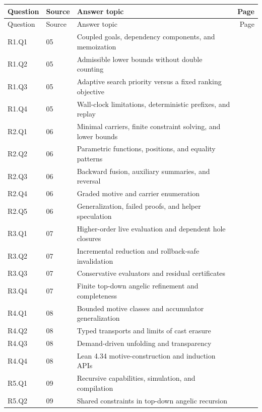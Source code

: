 \begin{longtable}{@{}L{17mm}L{14mm}L{105mm}r@{}}
\toprule
Question & Source & Answer topic & Page\\
\midrule
\endfirsthead
\toprule
Question & Source & Answer topic & Page\\
\midrule
\endhead
R1.Q1 & 05 & Coupled goals, dependency components, and memoization & \pageref{q:R1.Q1}\\
R1.Q2 & 05 & Admissible lower bounds without double counting & \pageref{q:R1.Q2}\\
R1.Q3 & 05 & Adaptive search priority versus a fixed ranking objective & \pageref{q:R1.Q3}\\
R1.Q4 & 05 & Wall-clock limitations, deterministic prefixes, and replay & \pageref{q:R1.Q4}\\
R2.Q1 & 06 & Minimal carriers, finite constraint solving, and lower bounds & \pageref{q:R2.Q1}\\
R2.Q2 & 06 & Parametric functions, positions, and equality patterns & \pageref{q:R2.Q2}\\
R2.Q3 & 06 & Backward fusion, auxiliary summaries, and reversal & \pageref{q:R2.Q3}\\
R2.Q4 & 06 & Graded motive and carrier enumeration & \pageref{q:R2.Q4}\\
R2.Q5 & 06 & Generalization, failed proofs, and helper speculation & \pageref{q:R2.Q5}\\
R3.Q1 & 07 & Higher-order live evaluation and dependent hole closures & \pageref{q:R3.Q1}\\
R3.Q2 & 07 & Incremental reduction and rollback-safe invalidation & \pageref{q:R3.Q2}\\
R3.Q3 & 07 & Conservative evaluators and residual certificates & \pageref{q:R3.Q3}\\
R3.Q4 & 07 & Finite top-down angelic refinement and completeness & \pageref{q:R3.Q4}\\
R4.Q1 & 08 & Bounded motive classes and accumulator generalization & \pageref{q:R4.Q1}\\
R4.Q2 & 08 & Typed transports and limits of cast erasure & \pageref{q:R4.Q2}\\
R4.Q3 & 08 & Demand-driven unfolding and transparency & \pageref{q:R4.Q3}\\
R4.Q4 & 08 & Lean 4.34 motive-construction and induction APIs & \pageref{q:R4.Q4}\\
R5.Q1 & 09 & Recursive capabilities, simulation, and compilation & \pageref{q:R5.Q1}\\
R5.Q2 & 09 & Shared constraints in top-down angelic recursion & \pageref{q:R5.Q2}\\

\end{longtable}
